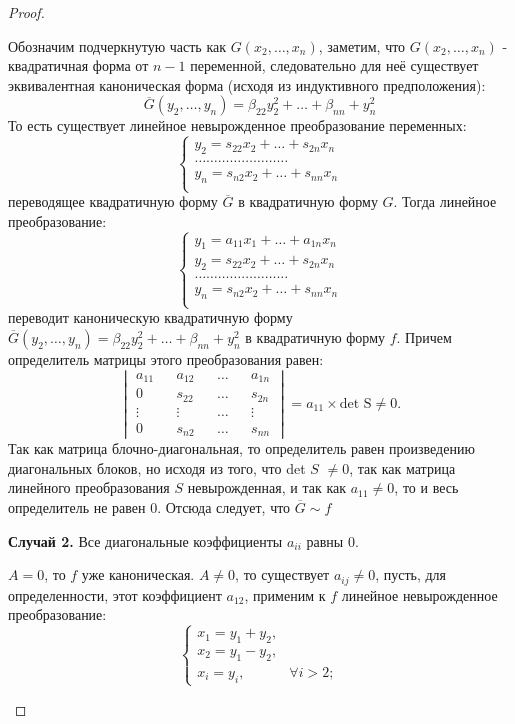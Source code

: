 \documentclass[../../main.tex]{subfiles}
\begin{document}
\begin{proof}
\begin{itemize}
	Обозначим подчеркнутую часть как $G(x_{2}, \dots, x_{n})$, заметим, что $G(x_{2}, \dots, x_{n})$ - квадратичная форма от $n - 1$ переменной, следовательно для неё существует эквивалентная каноническая форма (исходя из индуктивного предположения):
	\[
		\overline{G} (y_{2}, \dots, y_{n}) = \beta_{2 2} y^{2}_{2} + \dots + \beta_{n n} + y^{2}_{n}
	\]
	То есть существует линейное невырожденное преобразование переменных:
	\[
	\begin{cases}
		y_{2} = s_{2 2} x_{2} + \dots + s_{2 n} x_{n} \\
		\dots\dots\dots\dots\dots\dots\dots\dots\\
		y_{n} = s_{n 2} x_{2} + \dots + s_{n n} x_{n} \\
	\end{cases}
	\]
	переводящее квадратичную форму $\overline{G}$ в квадратичную форму $G$. Тогда линейное преобразование:
	\[
	\begin{cases}
		y_{1} = a_{1 1} x_{1} + \dots + a_{1 n} x_{n} \\
		y_{2} = s_{2 2} x_{2} + \dots + s_{2 n} x_{n} \\
		\dots\dots\dots\dots\dots\dots\dots\dots\\
		y_{n} = s_{n 2} x_{2} + \dots + s_{n n} x_{n} \\
	\end{cases}
	\]
	переводит каноническую квадратичную форму $\overline{G} (y_{2}, \dots, y_{n}) = \beta_{2 2} y^{2}_{2} + \dots + \beta_{n n} + y^{2}_{n}$ в квадратичную форму $f$. Причем определитель матрицы этого преобразования равен:
	\[
		\begin{vmatrix}
			a_{1 1} && a_{1 2} && \dots && a_{1 n} \\
			0 && s_{2 2} && \dots && s_{2 n} \\
			\vdots && \vdots &&  \dots && \vdots \\
			0 && s_{n 2} && \dots && s_{n n}
		\end{vmatrix}
		= a_{1 1} \times \text{det S} \ne 0\text{.}
	\]
	Так как матрица блочно-диагональная, то определитель равен произведению диагональных блоков, но исходя из того, что det $S$ $\ne 0$, так как матрица линейного преобразования $S$ невырожденная, и так как $a_{1 1} \ne 0$, то и весь определитель не равен 0. Отсюда следует, что $\overline{G} \sim f$

	\textbf{Случай 2.} Все диагональные коэффициенты $a_{i i}$ равны 0. 
	\begin{itemize}
		 $A = 0$, то $f$ уже каноническая.
		 $A \ne 0$, то существует $a_{i j} \ne 0$, пусть, для определенности, этот коэффициент $a_{1 2}$, применим к $f$ линейное невырожденное преобразование:
		\[
			\begin{cases} 
				x_{1} = y_{1} + y_{2}, \\
				x_{2} = y_{1} - y_{2}, \\
				x_{i} = y_{i}, & \forall i > 2;
			\end{cases}
		\]
	\end{itemize}
	

	
\end{itemize}


\end{proof}
\end{document}

